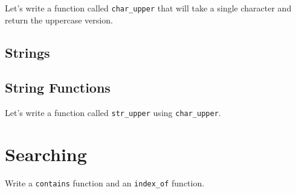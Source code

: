 \documentclass[12pt]{article}
\begin{document}
Let's write a function called \lstinline{char_upper} that will take a single
character and return the uppercase version.

\subsection{Strings}



\subsection{String Functions}

Let's write a function called \lstinline{str_upper} using
\lstinline{char_upper}.

\section{Searching}

Write a \lstinline{contains} function and an \lstinline{index_of} function.
\end{document}
